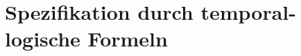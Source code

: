 \section{Spezifikation durch temporal-logische Formeln}
\label{sec:para3}
\nextlecture


\cleardoubleoddemptypage